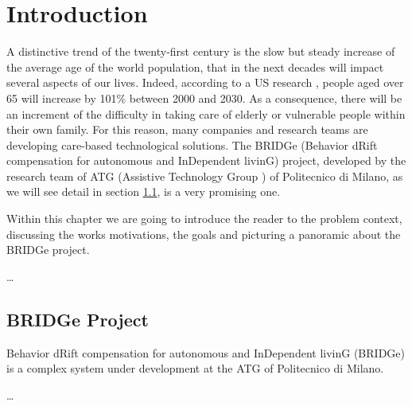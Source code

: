 
\chapter{Introduction}
\label{Chapter1} 

A distinctive trend of the twenty-first century is the slow but steady increase of the average age of the world population, that in the next decades will impact several aspects of our lives. Indeed, according to a US research \cite{ruder2008challenges}, people aged over 65 will increase by 101\% between 2000 and 2030. As a consequence, there will be an increment of the difficulty in taking care of elderly or vulnerable people within their own family.
For this reason, many companies and research teams are developing care-based technological solutions. 
The BRIDGe (Behavior dRift compensation for autonomous and InDependent livinG) project, developed by the research team of ATG (Assistive Technology Group \cite{b119}) of Politecnico di Milano, as we will see detail in section \ref{BRIDGeDescription}, is a very promising one.

Within this chapter we are going to introduce the reader to the problem context, discussing the works motivations, the goals and picturing a panoramic about the BRIDGe project.

\dots

\section{BRIDGe Project}
\label{BRIDGeDescription}
Behavior dRift compensation for autonomous and InDependent livinG (BRIDGe) is a complex system under development at the ATG of Politecnico di Milano. 

\dots

